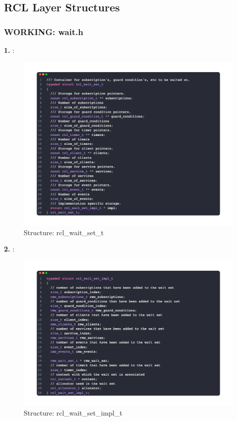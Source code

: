 \subsection{RCL Layer Structures}
\subsubsection{WORKING: wait.h}
\textbf{1. }: 
\begin{figure}[htbp!]
    \centering
    \includegraphics[width=1\linewidth]{Sec/Implementation/rcl/fig/rcl_wait_set_t.png}
    \caption{Structure: rcl\_wait\_set\_t}
    \vspace{-0.1in}
\end{figure}

\textbf{2. }: 
\begin{figure}[htbp!]
    \centering
    \includegraphics[width=1\linewidth]{Sec/Implementation/rcl/fig/rcl_wait_set_impl_t.png}
    \caption{Structure: rcl\_wait\_set\_impl\_t}
    \vspace{-0.1in}
\end{figure}